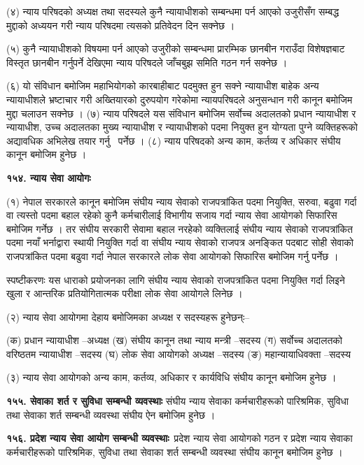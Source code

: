 (४) न्याय परिषदको अध्यक्ष तथा सदस्यले कुनै न्यायाधीशको सम्बन्धमा पर्न आएको उजुरीसँग सम्बद्ध मुद्दाको अध्ययन गरी न्याय
परिषदमा त्यसको प्रतिवेदन दिन सक्नेछ ।

(५) कुनै न्यायाधीशको विषयमा पर्न आएको उजुरीको सम्बन्धमा प्रारम्भिक छानबीन गराउँदा विशेषज्ञबाट विस्तृत छानबीन गर्नुपर्ने देखिएमा न्याय परिषदले जाँचबुझ समिति गठन गर्न सक्नेछ ।

(६) यो संविधान बमोजिम महाभियोगको कारबाहीबाट पदमुक्त हुन सक्ने न्यायाधीश बाहेक अन्य न्यायाधीशले भ्रष्टाचार गरी अख्तियारको दुरुपयोग गरेकोमा न्यायपरिषदले अनुसन्धान गरी कानून बमोजिम मुद्दा चलाउन सक्नेछ ।
(७) न्याय परिषदले यस संविधान बमोजिम सर्वोच्च अदालतको प्रधान न्यायाधीश र न्यायाधीश, उच्च अदालतका मुख्य न्यायाधीश र न्यायाधीशको पदमा नियुक्त हुन योग्यता पुग्ने व्यक्तिहरूको अद्यावधिक अभिलेख तयार गर्नु  पर्नेछ ।
(८) न्याय परिषदको अन्य काम, कर्तव्य र अधिकार संघीय कानून बमोजिम हुनेछ ।

\textbf{१५४. न्याय सेवा आयोगः}

(१) नेपाल सरकारले कानून बमोजिम संघीय न्याय सेवाको राजपत्रांकित पदमा नियुक्ति, सरुवा, बढुवा गर्दा वा त्यस्तो पदमा बहाल रहेको कुनै कर्मचारीलाई विभागीय सजाय गर्दा न्याय सेवा आयोगको सिफारिस बमोजिम गर्नेछ । तर संघीय सरकारी सेवामा बहाल नरहेको व्यक्तिलाई संघीय न्याय सेवाको राजपत्रांकित पदमा नयाँ भर्नाद्वारा स्थायी नियुक्ति गर्दा वा संघीय न्याय सेवाको राजपत्र अनङ्कित पदबाट सोही सेवाको राजपत्रांकित पदमा बढुवा गर्दा नेपाल सरकारले लोक सेवा आयोगको सिफारिस बमोजिम गर्नु पर्नेछ ।

स्पष्टीकरणः यस धाराको प्रयोजनका लागि संघीय न्याय सेवाको राजपत्रांकित पदमा नियुक्ति गर्दा लिइने खुला र आन्तरिक प्रतियोगितात्मक परीक्षा लोक सेवा आयोगले लिनेछ ।

(२) न्याय सेवा आयोगमा देहाय बमोजिमका अध्यक्ष र सदस्यहरू हुनेछन्ः–

(क) प्रधान न्यायाधीश –अध्यक्ष
(ख) संघीय कानून तथा न्याय मन्त्री –सदस्य
(ग) सर्वोच्च अदालतको वरिष्ठतम न्यायाधीश –सदस्य
(घ) लोक सेवा आयोगको अध्यक्ष –सदस्य
(ङ) महान्यायाधिवक्ता –सदस्य

(३) न्याय सेवा आयोगको अन्य काम, कर्तव्य, अधिकार र कार्यविधि संघीय कानून बमोजिम हुनेछ ।

\textbf{१५५. सेवाका शर्त र सुविधा सम्बन्धी व्यवस्थाः} संघीय न्याय सेवाका कर्मचारीहरूको पारिश्रमिक, सुविधा तथा सेवाका शर्त सम्बन्धी व्यवस्था संघीय ऐन बमोजिम हुनेछ ।

\textbf{१५६. प्रदेश न्याय सेवा आयोग सम्बन्धी व्यवस्थाः} प्रदेश न्याय सेवा आयोगको गठन र प्रदेश न्याय सेवाका कर्मचारीहरूको पारिश्रमिक, सुविधा तथा सेवाका शर्त सम्बन्धी व्यवस्था संघीय कानून बमोजिम हुनेछ ।